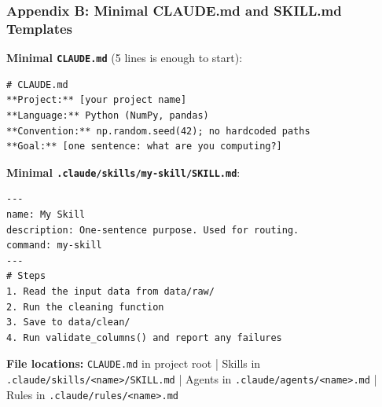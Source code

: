 \documentclass[10pt,english,aspectratio=169]{beamer}
\begin{document}
\begin{frame}[fragile]
\frametitle{Appendix B: Minimal CLAUDE.md and SKILL.md Templates}

\textbf{Minimal \texttt{CLAUDE.md}} (5 lines is enough to start):
\begin{lstlisting}[style=pythonstyle,language={},basicstyle=\ttfamily\tiny,numbers=none]
# CLAUDE.md
**Project:** [your project name]
**Language:** Python (NumPy, pandas)
**Convention:** np.random.seed(42); no hardcoded paths
**Goal:** [one sentence: what are you computing?]
\end{lstlisting}

\textbf{Minimal \texttt{.claude/skills/my-skill/SKILL.md}}:
\begin{lstlisting}[style=pythonstyle,language={},basicstyle=\ttfamily\tiny,numbers=none]
---
name: My Skill
description: One-sentence purpose. Used for routing.
command: my-skill
---
# Steps
1. Read the input data from data/raw/
2. Run the cleaning function
3. Save to data/clean/
4. Run validate_columns() and report any failures
\end{lstlisting}

\textbf{File locations:}
\texttt{CLAUDE.md} in project root \;|\; Skills in \texttt{.claude/skills/<name>/SKILL.md} \;|\; Agents in \texttt{.claude/agents/<name>.md} \;|\; Rules in \texttt{.claude/rules/<name>.md}
\end{frame}
\end{document}
